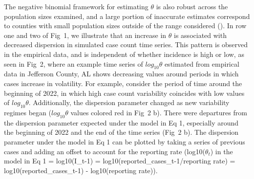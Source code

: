 \documentclass[10pt,letterpaper]{article}
\begin{document}
The negative binomial framework for estimating \begin{math}\theta\end{math} is also robust across the population sizes examined, and a large portion of inaccurate estimates correspond to counties with small population sizes outside of the range considered ().
In row one and two of Fig\ 1, we illustrate that an increase in \begin{math}\theta\end{math} is associated with decreased dispersion in simulated case count time series. This pattern is observed in the empirical data, and is independent of whether incidence is high or low, as seen in Fig\ 2, where an example time series of $log_{10}\theta$ estimated from empirical data in Jefferson County, AL shows decreasing values around periods in which cases increase in volatility. For example, consider the period of time around the beginning of 2022, in which high case count variability coincides with low values of $log_{10}\theta$. 
Additionally, the dispersion parameter changed as new variability regimes began ($log_{10}\theta$ values colored red in Fig\ 2 b). 
There were departures from the dispersion parameter expected under the model in Eq 1, especially around the beginning of 2022 and the end of the time series (Fig\ 2 b). The dispersion parameter under the model in Eq 1 can be plotted by taking a series of previous cases and adding an offset to account for the reporting rate (log10($\theta_t$) in the model in Eq 1 = log10(I_{t-1}) = log10(reported_cases_{t-1}/reporting rate) = log10(reported_cases_{t-1}) - log10(reporting rate)).
\end{document}
